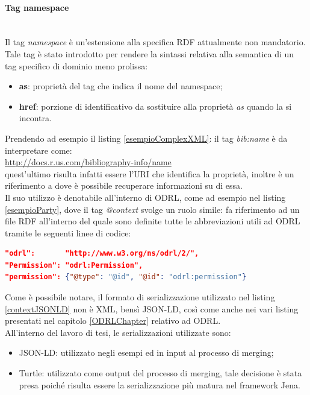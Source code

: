 \documentclass[12pt,a4paper,twoside]{book}
\begin{document}
\paragraph{Tag namespace}\mbox{}\\
Il tag \textit{namespace} è un'estensione alla specifica RDF attualmente non mandatorio. Tale tag è stato introdotto per rendere la sintassi relativa alla semantica di un tag specifico di dominio meno prolissa:
\begin{itemize}
 \item \textbf{as}: proprietà del tag che indica il nome del namespace;
 \item \textbf{href}: porzione di identificativo da sostituire alla proprietà \textit{as} quando la si incontra.
\end{itemize} 
Prendendo ad esempio il listing \ref{esempioComplexXML}: il tag \textit{bib:name} è da interpretare come: \\\url{http://docs.r.us.com/bibliography-info/name}\\ quest'ultimo risulta infatti essere l'URI che identifica la proprietà, inoltre è un riferimento a dove è possibile recuperare informazioni su di essa.\\
Il suo utilizzo è denotabile all'interno di ODRL, come ad esempio nel listing \ref{esempioParty}, dove il tag \textit{@context} svolge un ruolo simile: fa riferimento ad un file RDF all'interno del quale sono definite tutte le abbreviazioni utili ad ODRL tramite le seguenti linee di codice:
\begin{lstlisting}[language=json,firstnumber=1,caption={Estratto context ODRL\cite{ODRLContext}},captionpos=b,label=contextJSONLD]
"odrl":       "http://www.w3.org/ns/odrl/2/",
"Permission": "odrl:Permission",
"permission": {"@type": "@id", "@id": "odrl:permission"}
\end{lstlisting}
Come è possibile notare, il formato di serializzazione utilizzato nel listing \ref{contextJSONLD} non è XML, bensì JSON-LD, così come anche nei vari listing presentati nel capitolo \ref{ODRLChapter} relativo ad ODRL.\\
All'interno del lavoro di tesi, le serializzazioni utilizzate sono:
\begin{itemize}
\item JSON-LD: utilizzato negli esempi ed in input al processo di merging;
\item Turtle\cite{Turtle}: utilizzato come output del processo di merging, tale decisione è stata presa poiché risulta essere la serializzazione più matura nel framework Jena.
\end{itemize}
\end{document}
